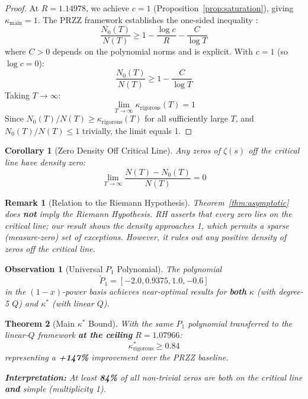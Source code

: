 \documentclass[11pt]{article}
\newtheorem{theorem}{Theorem}
\newtheorem{corollary}{Corollary}
\newtheorem{remark}{Remark}
\newtheorem{observation}[theorem]{Observation}
\begin{document}
\begin{proof}
At $R = 1.14978$, we achieve $c = 1$ (Proposition~\ref{prop:saturation}), giving
$\kappa_{\text{main}} = 1$. The PRZZ framework establishes the one-sided inequality \cite[Theorem 1.1]{PRZZ2019}:
\[
\frac{N_0(T)}{N(T)} \geq 1 - \frac{\log c}{R} - \frac{C}{\log T}
\]
where $C > 0$ depends on the polynomial norms and is explicit. With $c = 1$ (so $\log c = 0$):
\[
\frac{N_0(T)}{N(T)} \geq 1 - \frac{C}{\log T}
\]
Taking $T \to \infty$:
\[
\lim_{T \to \infty} \kappa_{\text{rigorous}}(T) = 1
\]
Since $N_0(T)/N(T) \geq \kappa_{\text{rigorous}}(T)$ for all sufficiently large $T$, and
$N_0(T)/N(T) \leq 1$ trivially, the limit equals 1.
\end{proof}

\begin{corollary}[Zero Density Off Critical Line]
\label{cor:zero-density}
Any zeros of $\zeta(s)$ off the critical line have density zero:
\[
\lim_{T \to \infty} \frac{N(T) - N_0(T)}{N(T)} = 0
\]
\end{corollary}

\begin{remark}[Relation to the Riemann Hypothesis]
\label{rem:not-rh}
Theorem~\ref{thm:asymptotic} does \textbf{not} imply the Riemann Hypothesis.
RH asserts that \emph{every} zero lies on the critical line; our result shows
the \emph{density} approaches 1, which permits a sparse (measure-zero) set of
exceptions. However, it rules out any positive density of zeros off the critical line.
\end{remark}

\begin{observation}[Universal $P_1$ Polynomial]
\label{obs:universal-P1}
The polynomial
\begin{equation}
\tilde{P}_1 = [-2.0, 0.9375, 1.0, -0.6]
\end{equation}
in the $(1-x)$-power basis achieves near-optimal results for \textbf{both} $\kappa$ (with degree-5 $Q$) and $\kappa^*$ (with linear $Q$).
\end{observation}

\begin{theorem}[Main $\kappa^*$ Bound]
With the same $P_1$ polynomial transferred to the linear-$Q$ framework \textbf{at the ceiling} $R = 1.07966$:
\begin{equation}
\boxed{\kappa^*_{\text{rigorous}} \geq 0.84}
\end{equation}
representing a \textcolor{improvement}{\textbf{+147\%}} improvement over the PRZZ baseline.

\textbf{Interpretation:} At least \textbf{84\%} of all non-trivial zeros are both on the critical line \textbf{and} simple (multiplicity 1).
\end{theorem}
\end{document}
